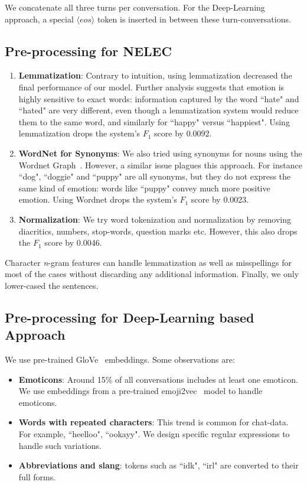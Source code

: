 \documentclass[11pt,a4paper]{article}
\begin{document}
We concatenate all three turns per conversation. For the Deep-Learning approach, a special $\langle eos \rangle$ token is inserted in between these turn-conversations.

\subsection{Pre-processing for NELEC} \label{lexical_preprocess}

\begin{enumerate}
    \item \textbf{Lemmatization}: Contrary to intuition, using lemmatization decreased the final performance of our model. Further analysis suggests that emotion is highly sensitive to exact words: information captured by the word ``hate" and ``hated" are very different, even though a lemmatization system would reduce them to the same word, and similarly for ``happy" versus ``happiest". Using lemmatization drops the system's $F_{1}$ score by 0.0092.
    \item \textbf{WordNet for Synonyms}: We also tried using synonyms for nouns using the Wordnet Graph~\cite{miller1998wordnet}. However, a similar issue plagues this approach. For instance ``dog", ``doggie" and ``puppy" are all synonyms, but they do not express the same kind of emotion: words like ``puppy" convey much more positive emotion. Using Wordnet drops the system's $F_{1}$ score by 0.0023. 
    \item \textbf{Normalization}: We try word tokenization and normalization by removing diacritics, numbers, stop-words, question marks etc.  However, this also drops the $F_{1}$ score by 0.0046.
\end{enumerate}

Character \textit{n}-gram features can handle lemmatization as well as misspellings for most of the cases without discarding any additional information. Finally, we only lower-cased the sentences.

\subsection{Pre-processing for Deep-Learning based Approach} \label{deep_preprocess}
We use pre-trained GloVe~\cite{pennington2014glove} embeddings. Some observations are:
\begin{itemize}
    \item \textbf{Emoticons}: Around 15\% of all conversations includes at least one emoticon. We use embeddings from a pre-trained emoji2vec~\cite{eisner2016emoji2vec} model to handle emoticons.
    \item \textbf{Words with repeated characters}:  This trend is common for chat-data. For example, ``heelloo", ``ookayy". We design specific regular expressions to handle such variations.
    \item \textbf{Abbreviations and slang}: tokens such as ``idk", ``irl" are converted to their full forms.
\end{itemize}
\end{document}
